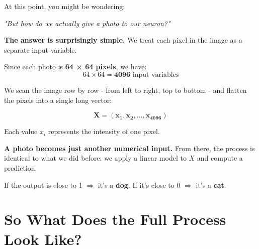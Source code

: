 \documentclass[11pt]{article}
\begin{document}
\vspace{0.5em}

At this point, you might be wondering:

\begin{center}
    \emph{"But how do we actually give a photo to our neuron?"}
\end{center}

\vspace{0.5em}

\noindent\textbf{The answer is surprisingly simple.}  
We treat each pixel in the image as a separate input variable.

\vspace{1em}

Since each photo is \textbf{64 × 64 pixels}, we have:
\[
64 \times 64 = \boldsymbol{4096} \text{ input variables}
\]

\vspace{0.5em}

We scan the image row by row - from left to right, top to bottom -  
and flatten the pixels into a single long vector:

\[
\boldsymbol{X = (x_1, x_2, \dots, x_{4096})}
\]

Each value $x_i$ represents the intensity of one pixel.

\vspace{1em}

\begin{tcolorbox}[colback=white!98!gray, colframe=gray!30!black, arc=1mm]
\textbf{A photo becomes just another numerical input.}  
From there, the process is identical to what we did before:  
we apply a linear model to $X$ and compute a prediction.
\end{tcolorbox}

\vspace{1em}

If the output is close to 1 $\Rightarrow$ it's a \textbf{dog}.  
If it's close to 0 $\Rightarrow$ it's a \textbf{cat}.

\begin{center}
\end{center}

\vspace{1em}

\section*{So What Does the Full Process Look Like?}
\end{document}
